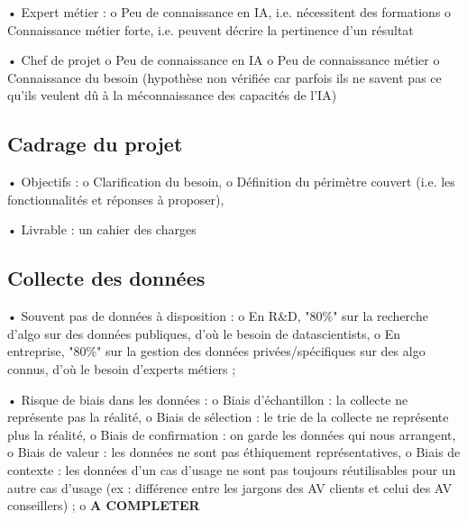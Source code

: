             •	Expert métier :
                o	Peu de connaissance en IA, i.e. nécessitent des formations
                o	Connaissance métier forte, i.e. peuvent décrire la pertinence d’un résultat
            
            •	Chef de projet
                o	Peu de connaissance en IA
                o	Peu de connaissance métier
                o	Connaissance du besoin (hypothèse non vérifiée car parfois ils ne savent pas ce qu’ils veulent dû à la méconnaissance des capacités de l’IA)

        \subsection{Cadrage du projet}

            •	Objectifs :
                o	Clarification du besoin,
                o	Définition du périmètre couvert (i.e. les fonctionnalités et réponses à proposer),

            •   Livrable : un cahier des charges
            

        \subsection{Collecte des données}

            •	Souvent pas de données à disposition :
                o	En R\&D, "80\%" sur la recherche d’algo sur des données publiques, d'où le besoin de datascientists,
                o	En entreprise, "80\%" sur la gestion des données privées/spécifiques sur des algo connus, d'où le besoin d'experts métiers ;
    
            •	Risque de biais dans les données :
                o	Biais d’échantillon : la collecte ne représente pas la réalité,
                o	Biais de sélection : le trie de la collecte ne représente plus la réalité,
                o	Biais de confirmation : on garde les données qui nous arrangent,
                o	Biais de valeur : les données ne sont pas éthiquement représentatives,
                o	Biais de contexte : les données d’un cas d’usage ne sont pas toujours réutilisables pour un autre cas d’usage (ex : différence entre les jargons des AV clients et celui des AV conseillers) ;
                o	\textbf{A COMPLETER}
            
